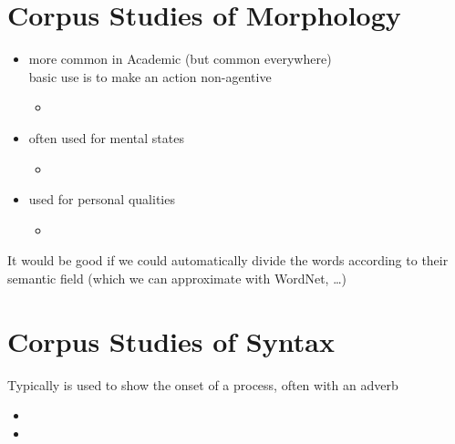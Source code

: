 \documentclass[a4paper,landscape,headrule,footrule,xetex]{foils}
\begin{document}
\section{Corpus Studies of Morphology}


\begin{itemize}
\item  {} more common in Academic (but common everywhere)
  \\ basic use is to make an action non-agentive
  \begin{itemize}
  \item {}
  \end{itemize}
\item {} often used for mental states
  \\  
  \begin{itemize}
  \item {} 
  \end{itemize}
\item {} used for personal qualities
  \\  
  \begin{itemize}
  \item {}
  \end{itemize}
\end{itemize}

It would be good if we could automatically divide the words according
to their semantic field (which we can approximate with WordNet, \ldots)

\section{Corpus Studies of Syntax}
\MyLogo{}

Typically  is used to show the onset of a process, often
with an adverb
\begin{itemize}
\item {}
\item {}
\end{itemize}
\end{document}
